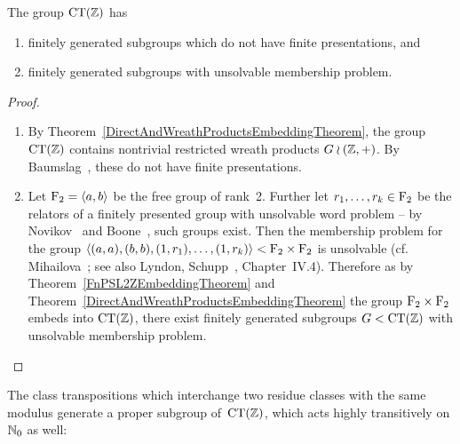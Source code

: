 \documentclass{amsart}
\theoremstyle{definition} \newtheorem{CTZDefinition}{Definition}[section]
\theoremstyle{plain}      \newtheorem{CTZPropertiesTheorem}[CTZDefinition]{Theorem}
\theoremstyle{plain}      \newtheorem{CTZSubgroupsTheorem}[CTZDefinition]{Theorem}
\theoremstyle{definition} \newtheorem{RcwaMappingDefinition}{Definition}[section]
\theoremstyle{definition} \newtheorem{RCWADefinition}[RcwaMappingDefinition]{Definition}
\theoremstyle{plain}      \newtheorem{CTZNotFinitelyGeneratedTheorem}
\theoremstyle{definition} \newtheorem{CTZSmEmbeddingDefinition}[RcwaMappingDefinition]{Definition}
\theoremstyle{plain}      \newtheorem{CTZHighlyTransitiveTheorem}[RcwaMappingDefinition]{Theorem}
\theoremstyle{plain}      \newtheorem{CTZTorsionElementsDivisibleTheorem}
\theoremstyle{plain}      \newtheorem{CTLemma}{Lemma}[section]
\theoremstyle{plain}      \newtheorem{IntegralCommutatorLemma}[CTLemma]{Lemma}
\theoremstyle{plain}      \newtheorem{NormalSubgroupContainsIntegralElementLemma}[CTLemma]{Lemma}
\theoremstyle{plain}      \newtheorem{CTZSimpleTheorem}[CTLemma]{Theorem}
\theoremstyle{remark}     \newtheorem{CTZSimpleRemark}[CTLemma]{Remark}
\theoremstyle{definition} \newtheorem{CTPZDefinition}[CTLemma]{Definition}
\theoremstyle{plain}      \newtheorem{CTPZSimpleCorollary}[CTLemma]{Corollary}
\theoremstyle{plain}      \newtheorem{CTPZSimpleProblem}[CTLemma]{Problem}
\theoremstyle{plain}      \newtheorem{FnPSL2ZEmbeddingTheorem}{Theorem}[section]
\theoremstyle{plain}      \newtheorem{FreeProductEmbeddingTheorem}[FnPSL2ZEmbeddingTheorem]{Theorem}
\theoremstyle{definition} \newtheorem{RestrictionMonomorphismDefinition}
\theoremstyle{plain}      \newtheorem{DirectAndWreathProductsEmbeddingTheorem}
\theoremstyle{plain}      \newtheorem{DirectAndWreathProductsEmbeddingCorollary}
\theoremstyle{definition} \newtheorem{CTintZDefinition}[FnPSL2ZEmbeddingTheorem]{Definition}
\theoremstyle{plain}      \newtheorem{CTintZSimpleTheorem}[FnPSL2ZEmbeddingTheorem]{Theorem}
\theoremstyle{definition} \newtheorem{KernelDefinition}{Definition}[section]
\theoremstyle{definition} \newtheorem{TameWildDefinition}[KernelDefinition]{Definition}
\theoremstyle{definition} \newtheorem{SimpleSupergroupsDefinition}[KernelDefinition]{Definition}
\theoremstyle{definition} \newtheorem{CSCRDefinition}[KernelDefinition]{Definition}
\theoremstyle{plain}      \newtheorem{SimpleSupergroupsGeneratorsTheorem}[KernelDefinition]{Theorem}
\theoremstyle{plain}      \newtheorem{SimpleSupergroupsTheorem}[KernelDefinition]{Theorem}
\theoremstyle{plain}      \newtheorem{SimpleSupergroupsTransitivityTheorem}
\theoremstyle{plain}      \newtheorem{TameGenerationConjecture}[KernelDefinition]{Conjecture}
\theoremstyle{remark}     \newtheorem{TameGenerationRemark}[KernelDefinition]{Remark}
\begin{document}
\begin{DirectAndWreathProductsEmbeddingCorollary} \label{DirectAndWreathProductsEmbeddingCorollary}
  The group \(\CT{\ZZ}\) has
  \begin{enumerate}

    \item finitely generated subgroups which do not have finite presentations, and

    \item finitely generated subgroups with unsolvable membership problem.

  \end{enumerate}
\end{DirectAndWreathProductsEmbeddingCorollary}
\begin{proof}
  \verb| |
  \begin{enumerate}

    \item By Theorem~\ref{DirectAndWreathProductsEmbeddingTheorem}, the group \(\CT{\ZZ}\)
          contains nontrivial restricted wreath products \(G \wr (\mathbb{Z},+)\).
          By Baumslag~\cite{Baumslag61}, these do not have finite presentations.

    \item Let \({\rm F}_2 = \langle a, b \rangle\) be the free group of rank~2. Further let
          \mbox{\(r_1, \dots, r_k \in {\rm F}_2\)} be the relators of a finitely presented group
          with unsolvable word problem -- by Novikov~\cite{Novikov55} and Boone~\cite{Boone59},
          such groups exist. Then the membership problem for the group
          \(\langle (a,a), (b,b), (1,r_1), \dots, (1,r_k) \rangle < {\rm F}_2 \times {\rm F}_2\)
          is unsolvable (cf. Mihailova~\cite{Mihailova66};
          see also Lyndon, Schupp~\cite{LyndonSchupp77}, Chapter~IV.4).
          Therefore as by Theorem~\ref{FnPSL2ZEmbeddingTheorem} and
          Theorem~\ref{DirectAndWreathProductsEmbeddingTheorem} the group
          \({\rm F}_2 \times {\rm F}_2\) embeds into \(\CT{\ZZ}\), there exist finitely
          generated subgroups \(G < \CT{\ZZ}\) with unsolvable membership problem.

  \end{enumerate}
  \vspace{-5mm}
\end{proof}

The class transpositions which interchange two residue classes with the same modulus generate
a proper subgroup of~\(\CT{\ZZ}\), which acts highly transitively on \(\mathbb{N}_0\) as well:
\end{document}
